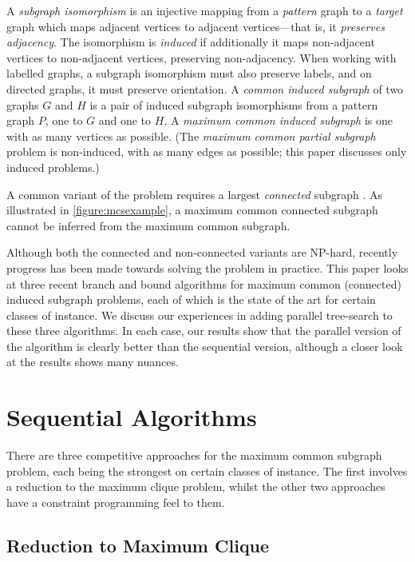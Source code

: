 \documentclass[sigconf]{acmart}
\begin{document}
A \emph{subgraph isomorphism} is an injective mapping from a \emph{pattern} graph to a \emph{target}
graph which maps adjacent vertices to adjacent vertices---that is, it \emph{preserves adjacency}.
The isomorphism is \emph{induced} if additionally it maps non-adjacent vertices to non-adjacent vertices, preserving
non-adjacency. When working with labelled graphs, a subgraph isomorphism must also preserve labels, and
on directed graphs, it must preserve orientation. A \emph{common induced subgraph} of two graphs $G$
and $H$ is a pair of induced subgraph isomorphisms from a pattern graph $P$, one to $G$ and one to
$H$. A \emph{maximum common induced subgraph} is one with as many vertices as possible. (The
\emph{maximum common partial subgraph} problem is non-induced, with as many edges as
possible; this paper discusses only induced problems.)

A common variant of the problem requires a largest \emph{connected} subgraph
\citep{DBLP:journals/jcamd/RaymondW02a,DBLP:conf/mco/VismaraV08,o:EhrlichR11,o:LuoWSN17}.  As
illustrated in \cref{figure:mcsexample}, a maximum common connected subgraph cannot be inferred
from the maximum common subgraph.

Although both the connected and non-connected variants are NP-hard, recently progress has been made
towards solving the problem in practice.  This paper looks at three recent branch and bound
algorithms for maximum common (connected) induced subgraph problems, each of which is the state of
the art for certain classes of instance. We discuss our experiences in adding parallel tree-search
to these three algorithms. In each case, our results show that the parallel version of the algorithm
is clearly better than the sequential version, although a closer look at the results shows many
nuances.

\section{Sequential Algorithms}

There are three competitive approaches for the maximum common subgraph problem, each being the
strongest on certain classes of instance. The first involves a reduction to the maximum clique
problem, whilst the other two approaches have a constraint programming feel to them.

\subsection{Reduction to Maximum Clique}
\end{document}
